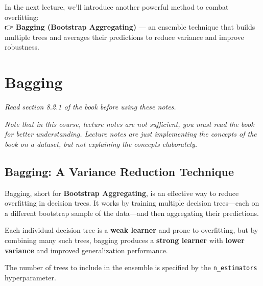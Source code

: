 \documentclass[
  letterpaper,
  DIV=11,
  numbers=noendperiod]{scrreprt}
\begin{document}
In the next lecture, we'll introduce another powerful method to combat
overfitting:\\
👉 \textbf{Bagging (Bootstrap Aggregating)} --- an ensemble technique
that builds multiple trees and averages their predictions to reduce
variance and improve robustness.

\chapter{Bagging}\label{bagging}

\emph{Read section 8.2.1 of the book before using these notes.}

\emph{Note that in this course, lecture notes are not sufficient, you
must read the book for better understanding. Lecture notes are just
implementing the concepts of the book on a dataset, but not explaining
the concepts elaborately.}

\section{Bagging: A Variance Reduction
Technique}\label{bagging-a-variance-reduction-technique}

Bagging, short for \textbf{Bootstrap Aggregating}, is an effective way
to reduce overfitting in decision trees. It works by training multiple
decision trees---each on a different bootstrap sample of the data---and
then aggregating their predictions.

Each individual decision tree is a \textbf{weak learner} and prone to
overfitting, but by combining many such trees, bagging produces a
\textbf{strong learner} with \textbf{lower variance} and improved
generalization performance.

The number of trees to include in the ensemble is specified by the
\texttt{n\_estimators} hyperparameter.
\end{document}
